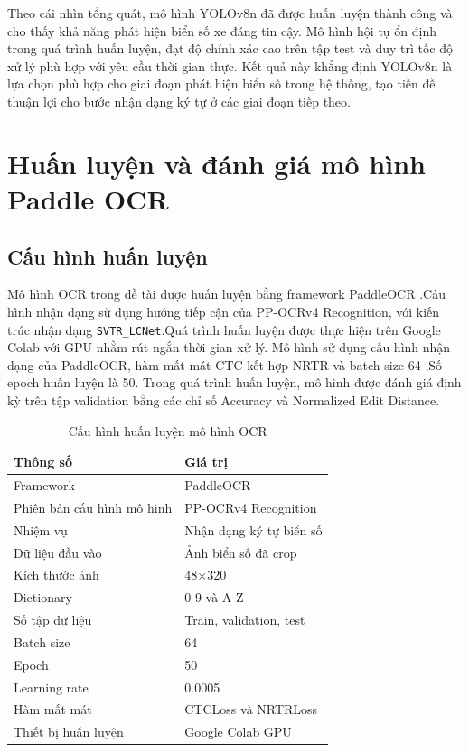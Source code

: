 \documentclass[13pt,a4paper]{report}
\begin{document}
Theo cái nhìn tổng quát, mô hình YOLOv8n đã được huấn luyện thành công và cho thấy khả 
năng phát hiện biển số xe đáng tin cậy. Mô hình hội tụ ổn định trong quá 
trình huấn luyện, đạt độ chính xác cao trên tập test và duy trì tốc độ xử lý 
phù hợp với yêu cầu thời gian thực. Kết quả này khẳng định YOLOv8n là lựa 
chọn phù hợp cho giai đoạn phát hiện biển số trong hệ thống, tạo tiền đề 
thuận lợi cho bước nhận dạng ký tự ở các giai đoạn tiếp theo.


\section{Huấn luyện và đánh giá mô hình Paddle OCR}

\subsection{Cấu hình huấn luyện}

Mô hình OCR trong đề tài được huấn luyện bằng framework PaddleOCR .Cấu hình nhận dạng sử dụng hướng tiếp cận của PP-OCRv4 Recognition, với kiến trúc nhận dạng \texttt{SVTR\_LCNet}.Quá trình huấn luyện được thực hiện trên Google Colab với GPU nhằm rút ngắn thời gian xử lý. Mô hình sử dụng cấu hình nhận dạng của PaddleOCR, hàm mất mát CTC kết hợp NRTR và batch size 64 ,Số epoch huấn luyện là 50. Trong quá trình huấn luyện, mô hình được đánh giá định kỳ trên tập validation bằng các chỉ số Accuracy và Normalized Edit Distance.

\begin{table}[H]
	\centering
	\caption{Cấu hình huấn luyện mô hình OCR}
	\label{tab:ocr_train_config}
	\renewcommand{\arraystretch}{1.4}
	\begin{tabular}{|p{5cm}|p{8cm}|}
		\hline
		\textbf{Thông số} & \textbf{Giá trị} \\
		\hline
		Framework & PaddleOCR \\
		\hline
		Phiên bản cấu hình mô hình & PP-OCRv4 Recognition \\
		\hline
		Nhiệm vụ & Nhận dạng ký tự biển số \\
		\hline
		Dữ liệu đầu vào & Ảnh biển số đã crop \\
		\hline
		Kích thước ảnh & 48$\times$320 \\
		\hline
		Dictionary & 0-9 và A-Z \\
		\hline
		Số tập dữ liệu & Train, validation, test \\
		\hline
		Batch size & 64 \\
		\hline
		Epoch & 50 \\
		\hline
		Learning rate & 0.0005 \\
		\hline
		Hàm mất mát & CTCLoss và NRTRLoss \\
		\hline
		Thiết bị huấn luyện & Google Colab GPU \\
		\hline
	\end{tabular}
\end{table}
\end{document}
